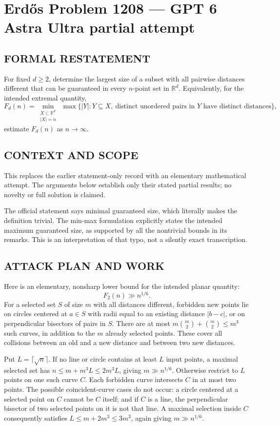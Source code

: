 \section*{Erd\H{o}s Problem 1208 --- GPT 6 Astra Ultra partial attempt}


\subsection*{FORMAL RESTATEMENT}
For fixed $d\geq2$, determine the largest size of a subset with all pairwise distances different that can be guaranteed in every $n$-point set in $\mathbb R^d$. Equivalently, for the intended extremal quantity,
\[F_d(n)=\min_{\substack{X\subset\mathbb R^d\\|X|=n}}\ \max\{|Y|:Y\subseteq X,\ \text{distinct unordered pairs in }Y\text{ have distinct distances}\},\]
estimate $F_d(n)$ as $n\to\infty$.

\subsection*{CONTEXT AND SCOPE}
This replaces the earlier statement-only record with an elementary mathematical attempt. The arguments below establish only their stated partial results; no novelty or full solution is claimed.

The official statement says minimal guaranteed size, which literally makes the definition trivial. The min-max formulation explicitly states the intended maximum guaranteed size, as supported by all the nontrivial bounds in its remarks. This is an interpretation of that typo, not a silently exact transcription.

\subsection*{ATTACK PLAN AND WORK}
Here is an elementary, nonsharp lower bound for the intended planar quantity:
\[F_2(n)\gg n^{1/6}.\tag{1}\]
For a selected set $S$ of size $m$ with all distances different, forbidden new
points lie on circles centered at $a\in S$ with radii equal to an existing
distance $|b-c|$, or on perpendicular bisectors of pairs in $S$.
There are at most $m\binom m2+\binom m2\le m^3$ such curves, in addition
to the $m$ already selected points. These cover all collisions between an old
and a new distance and between two new distances.

Put $L=\lceil\sqrt n\rceil$. If no line or circle contains at least $L$ input
points, a maximal selected set has
$n\le m+m^3L\le2m^3L$, giving $m\gg n^{1/6}$.
Otherwise restrict to $L$ points on one such curve $C$. Each forbidden curve
intersects $C$ in at most two points. The possible coincident-curve cases do
not occur: a circle centered at a selected point on $C$ cannot be $C$ itself;
and if $C$ is a line, the perpendicular bisector of two selected points on it
is not that line. A maximal selection inside $C$ consequently satisfies
$L\le m+2m^3\le3m^3$, again giving $m\gg n^{1/6}$.

